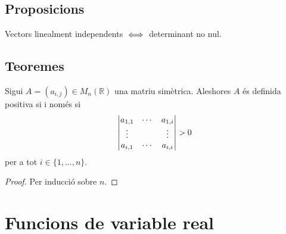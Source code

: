 \documentclass[../Apunts.tex]{subfiles}
\begin{document}
	\subsection{Proposicions}
	\begin{proposition}
		\label{prop:determinant diferent de zero linealment independents}
		Vectors linealment independents \(\iff\) determinant no nul.
	\end{proposition}
	\subsection{Teoremes}
	\begin{theorem}
		Sigui \(A=(a_{i,j})\in M_{n}(\mathbb{R})\) una matriu simètrica. Aleshores \(A\) és definida positiva si i només si
		\[\abs{\begin{matrix}
		a_{1,1}&\cdots&a_{1,i}\\
		\vdots&&\vdots\\
		a_{i,1}&\cdots&a_{i,i}\\
		\end{matrix}}>0\]
		per a tot \(i\in\{1,\dots,n\}\).
		\begin{proof}
			Per inducció sobre \(n\).
		\end{proof}
	\end{theorem}
\section{Funcions de variable real}
\end{document}
